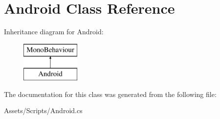 \hypertarget{class_android}{}\section{Android Class Reference}
\label{class_android}
Inheritance diagram for Android\+:\begin{figure}[H]
\begin{center}
\leavevmode
\includegraphics[height=2.000000cm]{class_android}
\end{center}
\end{figure}


The documentation for this class was generated from the following file\+:\begin{DoxyCompactItemize}
\item 
Assets/\+Scripts/Android.\+cs\end{DoxyCompactItemize}
